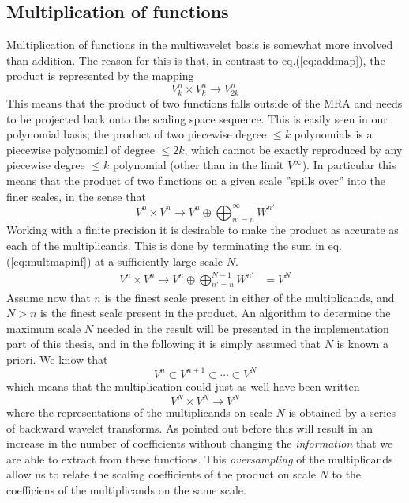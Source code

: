 \subsection{Multiplication of functions}
Multiplication of functions in the multiwavelet basis is somewhat more
involved than addition. The reason for this is that, in contrast to
eq.(\ref{eq:addmap}), the product is represented by the mapping \cite{Beylkin92}
\begin{equation}
	\label{eq:multmap}
	V^n_k \times V^n_k \rightarrow V^n_{2k}
\end{equation}
This means that the product of two functions falls outside of the MRA and
needs to be projected back onto the scaling space sequence. This is easily
seen in our polynomial basis; the product of two piecewise degree $\leq k$ 
polynomials is a piecewise polynomial of degree $\leq 2k$, which cannot be
exactly reproduced by any piecewise degree $\leq k$ polynomial (other than in
the limit $V^{\infty}$). In particular this means that the product of two 
functions on a given scale ''spills over'' into the finer scales, in the sense 
that 
\begin{equation}
	\label{eq:multmapinf}
	V^n \times V^n \rightarrow V^n \oplus \bigoplus_{n'=n}^{\infty} W^{n'}
\end{equation}
Working with a finite precision it is desirable to make the product as accurate
as each of the multiplicands. This is done by terminating the sum in
eq.(\ref{eq:multmapinf}) at a sufficiently large scale $N$.
\begin{align}
	\label{eq:multmapN}
	V^n \times V^n \rightarrow V^n \oplus \bigoplus_{n'=n}^{N-1} W^{n'} &= V^N
\end{align}
Assume now that $n$ is the finest scale present in either of the multiplicands,
and $N>n$ is the finest scale present in the product. An algorithm to 
determine the maximum scale $N$ needed in the result will be presented in the 
implementation part of this thesis, and in the following it is simply assumed 
that $N$ is known a priori. We know that
\[
	V^n \subset V^{n+1} \subset \cdots \subset V^N
\]
which means that the multiplication could just as well have been written 
\[
	V^N \times V^N \rightarrow V^N
\]
where the representations of the multiplicands on scale $N$ is obtained by a
series of backward wavelet transforms. As pointed out before this will result
in an increase in the number of coefficients without changing the
\emph{information} that we are able to extract from these functions. This
\emph{oversampling} of the multiplicands allow us to relate the scaling
coefficients of the product on scale $N$ to the coefficiens of the
multiplicands on the same scale.\\

